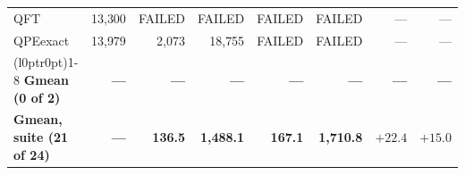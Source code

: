 \begin{table}[t]
\begin{tabular}{@{}lrrrrrrr@{}}
QFT & 13{,}300 & FAILED & FAILED & FAILED & FAILED & --- & --- \\
QPEexact & 13{,}979 & 2{,}073 & 18{,}755 & FAILED & FAILED & --- & --- \\
\cmidrule(l{0pt}r{0pt}){1-8}
\textbf{Gmean (0 of 2)} & \textbf{---} & \textbf{---} & \textbf{---} & \textbf{---} & \textbf{---} & \textbf{---} & \textbf{---} \\
\midrule
\textbf{Gmean, suite (21 of 24)} & \textbf{---} & \textbf{136.5} & \textbf{1{,}488.1} & \textbf{167.1} & \textbf{1{,}710.8} & $\mathbf{+22.4}$ & $\mathbf{+15.0}$ \\
\bottomrule
\end{tabular}
\end{table}
